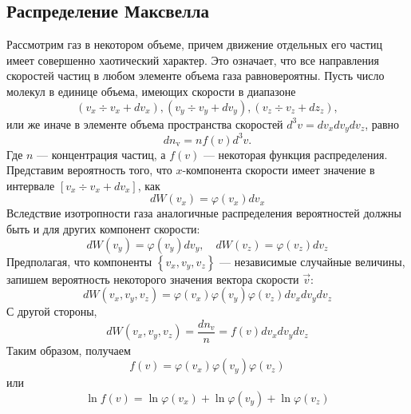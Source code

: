 \subsection{Распределение Максвелла}

Рассмотрим газ в некотором объеме, причем движение отдельных его частиц имеет совершен­но хаотический характер. Это означает, что все направления скоростей частиц в любом элементе объ­ема газа равновероятны. 
Пусть число молекул в единице объема, имеющих скорости в диапазоне
\begin{equation*}
	(v_x \div v_x+d v_x), (v_y \div v_y+d v_y), (v_z \div v_z+d z_z),
\end{equation*}
или же иначе в элементе объема пространства скоростей $d^3 v=d v_x d v_y d v_z$, равно
\begin{equation*}
	d n_{\mathrm{v}}=n f(v) d^3 v.
\end{equation*}
Где $n$ — концентрация частиц, а $f(v)$ — некоторая функция распределения.
Представим вероятность того, что $x$-компонента скорости имеет значение в интервале $[v_x \div v_x+d v_x]$, как
\begin{equation*}
	d W\left(v_x\right)=\varphi\left(v_x\right) d v_x
\end{equation*}
Вследствие изотропности газа аналогичные распределения вероятностей должны быть и для других компонент скорости:
\begin{equation*}
	d W\left(v_y\right)=\varphi\left(v_y\right) d v_y, \quad d W\left(v_z\right)=\varphi\left(v_z\right) d v_z
\end{equation*}
Предполагая, что компоненты $\left\{v_x, v_y, v_z\right\}$ — независимые случайные величины, запишем вероятность некоторого значения вектора скорости $\vec{v}$:
\begin{equation*}
	d W\left(v_x, v_y, v_z\right)=\varphi\left(v_x\right) \varphi\left(v_y\right) \varphi\left(v_z\right) d v_x d v_y d v_z
\end{equation*}
С другой стороны,
\begin{equation*}
	d W\left(v_x, v_y, v_z\right)=\frac{d n_v}{n}=f(v) d v_x d v_y d v_z
\end{equation*}
Таким образом, получаем
\begin{equation*}
	f(v)=\varphi\left(v_x\right) \varphi\left(v_y\right) \varphi\left(v_z\right)
\end{equation*}
или
\begin{equation}
\ln f(v)=\ln \varphi\left(v_x\right)+\ln \varphi\left(v_y\right)+\ln \varphi\left(v_z\right)
\label{eq:ln-maxwll}
\end{equation}
